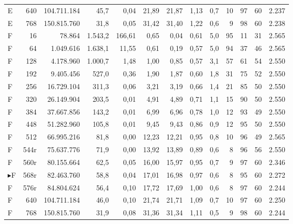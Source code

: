 {\begin{longtable}{l r r r r r r r r r r r r}
E & 640 & 104.711.184 & 45,7 & 0,04 & 21,89 & 21,87 & 1,13 & 0,7 & 10 & 97 & 60 & 2.237 \\
E & 768 & 150.815.760 & 31,8 & 0,05 & 31,42 & 31,40 & 1,22 & 0,6 & 9 & 98 & 60 & 2.238 \\
\midrule
F & 16 & 78.864 & 1.543,2 & 166,61 & 0,65 & 0,04 & 0,61 & 5,0 & 95 & 11 & 31 & 2.565 \\
F & 64 & 1.049.616 & 1.638,1 & 11,55 & 0,61 & 0,19 & 0,57 & 5,0 & 94 & 37 & 46 & 2.565 \\
F & 128 & 4.178.960 & 1.000,7 & 1,48 & 1,00 & 0,85 & 0,57 & 3,1 & 57 & 61 & 54 & 2.550 \\
F & 192 & 9.405.456 & 527,0 & 0,36 & 1,90 & 1,87 & 0,60 & 1,8 & 31 & 75 & 52 & 2.550 \\
F & 256 & 16.729.104 & 311,3 & 0,06 & 3,21 & 3,19 & 0,66 & 1,4 & 21 & 85 & 50 & 2.550 \\
F & 320 & 26.149.904 & 203,5 & 0,01 & 4,91 & 4,89 & 0,71 & 1,1 & 15 & 90 & 50 & 2.550 \\
F & 384 & 37.667.856 & 143,2 & 0,01 & 6,99 & 6,96 & 0,78 & 1,0 & 12 & 93 & 49 & 2.550 \\
F & 448 & 51.282.960 & 105,8 & 0,01 & 9,45 & 9,43 & 0,86 & 0,9 & 12 & 95 & 50 & 2.550 \\
F & 512 & 66.995.216 & 81,8 & 0,00 & 12,23 & 12,21 & 0,95 & 0,8 & 10 & 96 & 49 & 2.565 \\
F & 544r & 75.637.776 & 71,9 & 0,00 & 13,92 & 13,89 & 0,89 & 0,6 & 8 & 96 & 56 & 2.550 \\
F & 560r & 80.155.664 & 62,5 & 0,05 & 16,00 & 15,97 & 0,95 & 0,7 & 9 & 97 & 60 & 2.346 \\
$\blacktriangleright$F & 568r & 82.463.760 & 58,8 & 0,04 & 17,01 & 16,98 & 0,97 & 0,6 & 8 & 95 & 60 & 2.272 \\
F & 576r & 84.804.624 & 56,4 & 0,10 & 17,72 & 17,69 & 1,00 & 0,6 & 8 & 97 & 60 & 2.244 \\
F & 640 & 104.711.184 & 46,0 & 0,10 & 21,74 & 21,71 & 1,09 & 0,7 & 10 & 97 & 60 & 2.250 \\
F & 768 & 150.815.760 & 31,9 & 0,08 & 31,36 & 31,34 & 1,11 & 0,5 & 9 & 98 & 60 & 2.244 \\
\bottomrule
\end{longtable}
}
